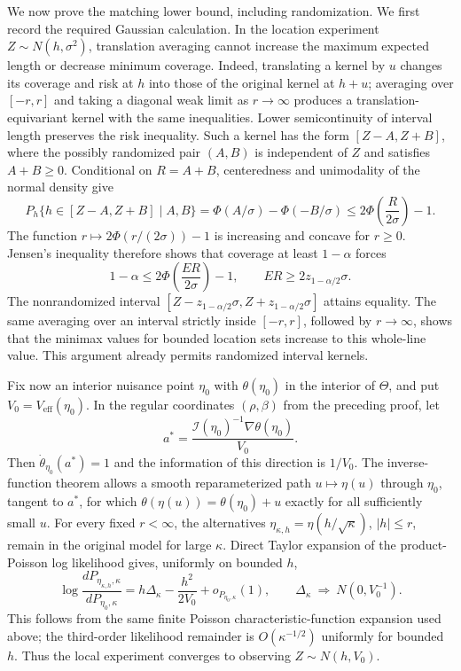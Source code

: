 We now prove the matching lower bound, including randomization.  We first
record the required Gaussian calculation.  In the location experiment
\(Z\sim N(h,\sigma^2)\), translation averaging cannot increase the maximum
expected length or decrease minimum coverage.  Indeed, translating a
kernel by \(u\) changes its coverage and risk at \(h\) into those of the
original kernel at \(h+u\); averaging over \([-r,r]\) and taking a diagonal
weak limit as \(r\to\infty\) produces a translation-equivariant kernel with
the same inequalities.  Lower semicontinuity of interval length preserves
the risk inequality.  Such a kernel has the form
\([Z-A,Z+B]\), where the possibly randomized pair \((A,B)\) is independent
of \(Z\) and satisfies \(A+B\geq0\).  Conditional on
\(R=A+B\), centeredness and unimodality of the normal density give
\[
 P_h\{h\in[Z-A,Z+B]\mid A,B\}
 =\Phi(A/\sigma)-\Phi(-B/\sigma)
 \leq 2\Phi\left(\frac{R}{2\sigma}\right)-1.
\]
The function \(r\mapsto2\Phi(r/(2\sigma))-1\) is increasing and concave
for \(r\geq0\).  Jensen's inequality therefore shows that coverage at
least \(1-\alpha\) forces
\[
 1-\alpha
 \leq2\Phi\left(\frac{E R}{2\sigma}\right)-1,
 \qquad
 E R\geq2z_{1-\alpha/2}\sigma.
\]
The nonrandomized interval
\([Z-z_{1-\alpha/2}\sigma,Z+z_{1-\alpha/2}\sigma]\) attains equality.
The same averaging over an interval strictly inside \([-r,r]\), followed
by \(r\to\infty\), shows that the minimax values for bounded location
sets increase to this whole-line value.  This argument already permits
randomized interval kernels.

Fix now an interior nuisance point \(\eta_0\) with
\(\theta(\eta_0)\) in the interior of \(\Theta\), and put
\(V_0=V_{\mathrm{eff}}(\eta_0)\).  In the regular coordinates
\((\rho,\beta)\) from the preceding proof, let
\[
 a^*=\frac{\mathcal I(\eta_0)^{-1}\nabla\theta(\eta_0)}{V_0}.
\]
Then \(\dot\theta_{\eta_0}(a^*)=1\) and the information of this direction
is \(1/V_0\).  The inverse-function theorem allows a smooth reparameterized
path \(u\mapsto\eta(u)\) through \(\eta_0\), tangent to \(a^*\), for which
\(\theta(\eta(u))=\theta(\eta_0)+u\) exactly for all sufficiently small
\(u\).  For every fixed \(r<\infty\), the alternatives
\(\eta_{\kappa,h}=\eta(h/\sqrt\kappa)\), \(|h|\leq r\), remain in the
original model for large \(\kappa\).  Direct Taylor expansion of the
product-Poisson log likelihood gives, uniformly on bounded \(h\),
\[
 \log\frac{dP_{\eta_{\kappa,h},\kappa}}
              {dP_{\eta_0,\kappa}}
 =h\Delta_\kappa-\frac{h^2}{2V_0}+o_{P_{\eta_0,\kappa}}(1),
 \qquad
 \Delta_\kappa\ \Longrightarrow\ N(0,V_0^{-1}).
\]
This follows from the same finite Poisson characteristic-function expansion
used above; the third-order likelihood remainder is
\(O(\kappa^{-1/2})\) uniformly for bounded \(h\).  Thus the local
experiment converges to observing \(Z\sim N(h,V_0)\).

